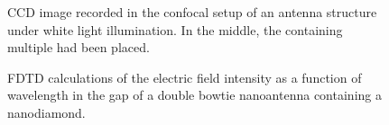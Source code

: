 	\begin{figure}[tp]
		\centering
		\caption{CCD image recorded in the confocal setup of an antenna structure under white light illumination. In the middle, the \nd containing multiple \sivs had been placed.}
		\label{fig::place_ccd}
	\end{figure}

	\begin{figure}[tp]
		\centering
		\caption{FDTD calculations of the electric field intensity as a function of wavelength in the gap of a double bowtie nanoantenna containing a nanodiamond.}
		\label{fig::antenna_fdtd_calculation}
	\end{figure}

